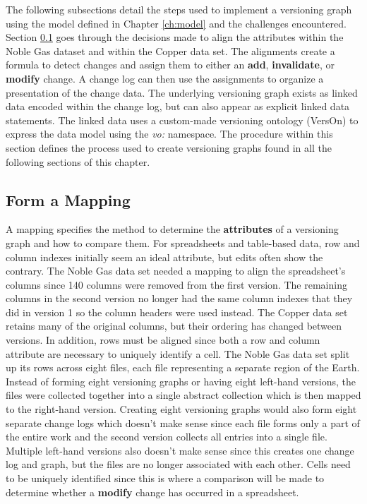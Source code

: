 The following subsections detail the steps used to implement a versioning graph using the model defined in Chapter \ref{ch:model} and the challenges encountered.
Section \ref{mapping} goes through the decisions made to align the attributes within the Noble Gas dataset and within the Copper data set.
The alignments create a formula to detect changes and assign them to either an \textbf{add}, \textbf{invalidate}, or \textbf{modify} change.
A change log can then use the assignments to organize a presentation of the change data.
The underlying versioning graph exists as linked data encoded within the change log, but can also appear as explicit linked data statements.
The linked data uses a custom-made versioning ontology (VersOn) to express the data model using the \textit{vo:} namespace.
The procedure within this section defines the process used to create versioning graphs found in all the following sections of this chapter.

\subsection{Form a Mapping} \label{mapping}

A mapping specifies the method to determine the \textbf{attributes} of a versioning graph and how to compare them.
For spreadsheets and table-based data, row and column indexes initially seem an ideal attribute, but edits often show the contrary.
The Noble Gas data set needed a mapping to align the spreadsheet's columns since 140 columns were removed from the first version.
The remaining columns in the second version no longer had the same column indexes that they did in version 1 so the column headers were used instead.
The Copper data set retains many of the original columns, but their ordering has changed between versions.
In addition, rows must be aligned since both a row and column attribute are necessary to uniquely identify a cell.
The Noble Gas data set split up its rows across eight files, each file representing a separate region of the Earth.
Instead of forming eight versioning graphs or having eight left-hand versions, the files were collected together into a single abstract collection which is then mapped to the right-hand version.
Creating eight versioning graphs would also form eight separate change logs which doesn't make sense since each file forms only a part of the entire work and the second version collects all entries into a single file.
Multiple left-hand versions also doesn't make sense since this creates one change log and graph, but the files are no longer associated with each other.
Cells need to be uniquely identified since this is where a comparison will be made to determine whether a \textbf{modify} change has occurred in a spreadsheet.

